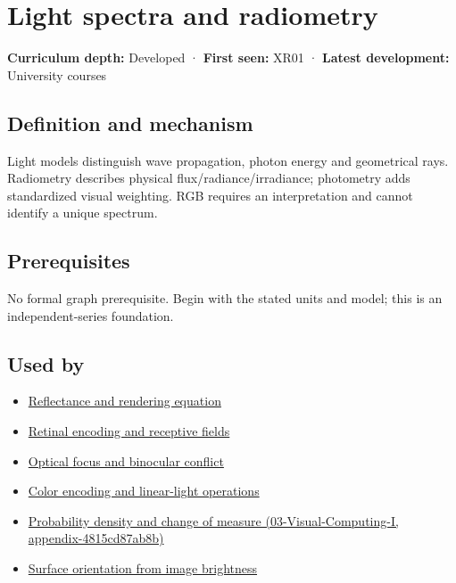 \hypertarget{appendix-215c2570199b}{}
\section{Light spectra and radiometry}\label{appendix-215c2570199b-light-spectra-and-radiometry}

\textbf{Curriculum depth:} Developed · \textbf{First seen:} XR01 · \textbf{Latest development:} University courses

\subsection{Definition and mechanism}\label{appendix-215c2570199b-definition-and-mechanism}

Light models distinguish wave propagation, photon energy and geometrical rays. Radiometry describes physical flux/radiance/irradiance; photometry adds standardized visual weighting. RGB requires an interpretation and cannot identify a unique spectrum.

\subsection{Prerequisites}\label{appendix-215c2570199b-prerequisites}

No formal graph prerequisite. Begin with the stated units and model; this is an independent-series foundation.

\subsection{Used by}\label{appendix-215c2570199b-used-by}

\begin{itemize}
\tightlist
\item
  \hyperref[appendix-96da0b153b77]{Reflectance and rendering equation}
\item
  \hyperref[appendix-7281c15ac44a]{Retinal encoding and receptive fields}
\item
  \hyperref[appendix-f90cee1be7a4]{Optical focus and binocular conflict}
\item
  \hyperref[appendix-a9f83ad40792]{Color encoding and linear-light operations}
\item
  \href{../03-Visual-Computing-I/main.pdf\#nameddest=appendix-4815cd87ab8b}{Probability density and change of measure (03-Visual-Computing-I, appendix-4815cd87ab8b)}
\item
  \hyperref[appendix-89b2d5b7c9e1]{Surface orientation from image brightness}
\end{itemize}

